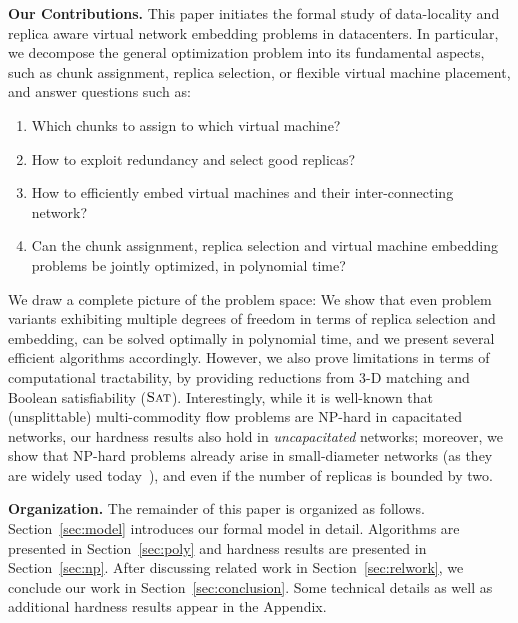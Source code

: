 \documentclass[9pt]{sigcomm-alternate}
\newcommand{\SAT}{\textsc{Sat}}
\begin{document}
\textbf{Our Contributions.}
This paper initiates the formal study of data-locality and replica aware virtual network embedding problems in datacenters.
In particular, we decompose the general optimization problem into its fundamental aspects, such as
chunk assignment, replica selection, or flexible virtual machine placement, and answer questions such as:
\begin{enumerate}
\item Which chunks to assign to which virtual machine?

\item How to exploit redundancy and select good replicas?

\item How to efficiently embed virtual machines and their inter-connecting network?

\item Can the chunk assignment, replica selection and virtual machine embedding problems be jointly optimized, in polynomial time?
\end{enumerate}

We draw a complete picture of the problem space: We show that
even problem variants exhibiting multiple degrees of freedom in terms of
replica selection and embedding,
can be solved optimally in polynomial time, and we present several efficient
algorithms accordingly. However, we also prove limitations in terms of
computational tractability, by providing reductions from 3-D matching
and Boolean satisfiability ($\SAT$). Interestingly,
while it is well-known that (unsplittable) multi-commodity flow
problems are NP-hard in capacitated networks, our hardness results also hold in \emph{uncapacitated}
networks; moreover, we show that NP-hard problems already arise in small-diameter networks (as they are
widely used today~\cite{fattree}),
and even if the number of replicas is bounded by two.


\textbf{Organization.}
The remainder of this paper is organized as follows.
Section~\ref{sec:model} introduces our formal model in detail.
Algorithms are presented in Section~\ref{sec:poly} and
hardness results are presented in Section~\ref{sec:np}.
After discussing related work in Section~\ref{sec:relwork},
we conclude our work in Section~\ref{sec:conclusion}.
Some technical details as well as additional hardness results
appear in the Appendix.
\end{document}
